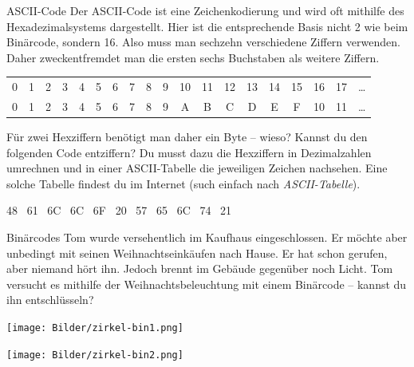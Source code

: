 \documentclass{uebungszettel}
\begin{document}

\begin{aufgabe}{ASCII-Code}
 Der ASCII-Code ist eine Zeichenkodierung und wird oft mithilfe des Hexadezimalsystems dargestellt.
 Hier ist die entsprechende Basis nicht 2 wie beim Binärcode, sondern 16. Also muss man sechzehn verschiedene Ziffern verwenden. Daher zweckentfremdet man
 die ersten sechs Buchstaben als weitere Ziffern.
 
\begin{tabular}{ c c c c c c c c c c c c c c c c c c c}
    0 & 1 & 2 & 3 & 4 & 5 & 6 & 7 & 8 & 9 & 10 & 11 & 12 & 13 & 14 & 15 & 16 & 17 & \ldots \\
    0 & 1 & 2 & 3 & 4 & 5 & 6 & 7 & 8 & 9 & A  & B  & C  & D  & E  & F & 10 & 11 & \ldots
 \end{tabular}

Für zwei Hexziffern benötigt man daher ein Byte -- wieso?
Kannst du den folgenden Code entziffern?
Du musst dazu die Hexziffern in Dezimalzahlen umrechnen und in einer ASCII-Tabelle die jeweiligen Zeichen nachsehen.
Eine solche Tabelle findest du im Internet (such einfach nach \emph{ASCII-Tabelle}).
\begin{center}
48 \ 61 \ 6C \ 6C \ 6F \ 20 \ 57 \ 65 \ 6C \ 74 \ 21
 \end{center}
\end{aufgabe}

\pagebreak
\begin{aufgabe}{Binärcodes}
 Tom wurde versehentlich im Kaufhaus eingeschlossen.
 Er möchte aber unbedingt mit seinen Weihnachtseinkäufen nach Hause.
 Er hat schon gerufen, aber niemand hört ihn. Jedoch brennt im Gebäude gegenüber noch Licht.
 Tom versucht es mithilfe der Weihnachtsbeleuchtung mit einem Binärcode -- kannst du ihn entschlüsseln?
  \begin{center}
\texttt{[image: Bilder/zirkel-bin1.png]} 
\end{center}
  \begin{center}
\texttt{[image: Bilder/zirkel-bin2.png]} 
\end{center}
\end{aufgabe}
\end{document}
